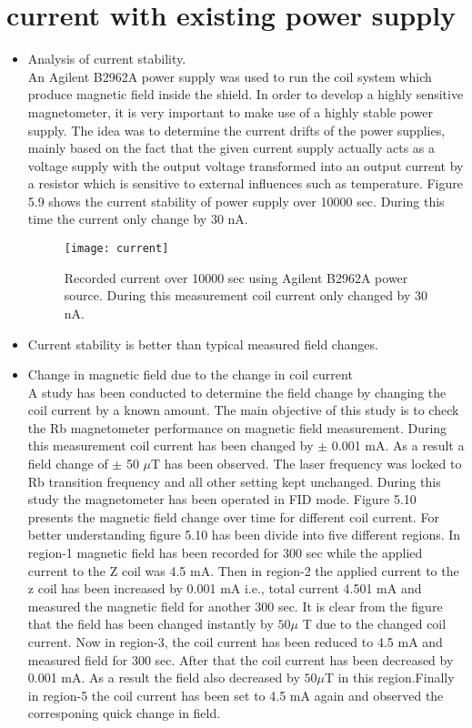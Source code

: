 \documentclass[12pt]{report}
\begin{document}
   \section{current with existing power supply}
   \begin{itemize}
   \item Analysis of current stability.\\
 An Agilent B2962A power supply was used to run the coil system which produce magnetic field inside the shield. In order to develop a highly sensitive magnetometer, it is very important to make use of a highly stable power supply. The idea was to determine the current drifts of the power supplies, mainly based on the fact that the given current supply actually acts as a voltage supply with the output voltage transformed into an output current by a resistor which is sensitive to external influences such as temperature. Figure 5.9 shows the current stability of power supply over 10000 sec. During this time the current only change by 30 nA.  
   \begin{figure}[h]
\centering
\texttt{[image: current]}
\caption{Recorded current over 10000 sec using Agilent B2962A power source. During this measurement coil current only changed by 30 nA. }
\end{figure}
   \item Current stability is better than typical measured field changes.
   \item Change in magnetic field due to the change in coil current\\
 A study has been conducted to determine the field change by changing the coil current by a known amount. The main objective of this study is to check the Rb magnetometer performance on magnetic field measurement. During this measurement coil current has been changed by $\pm$ 0.001 mA. As a result a field change of $\pm$ 50  $\mu$T  has been observed. The laser frequency was locked to Rb transition frequency and all other setting kept unchanged. During this study the magnetometer has been operated in FID mode. Figure 5.10 presents the magnetic field change over time for different coil current. For better understanding figure 5.10 has been divide into five different regions. In region-1 magnetic field  has been recorded for 300 sec while the applied current to the Z coil was 4.5 mA. Then in region-2 the applied current to the z coil has been increased by 0.001 mA i.e., total current 4.501 mA and measured the magnetic field for another 300 sec. It is clear from the figure that the field has been changed instantly by $50 \mu$ T due to the changed coil current. Now in region-3, the coil current has been reduced to 4.5 mA and measured field for 300 sec. After that the coil current has been decreased by 0.001 mA. As a result the field also decreased by $50 \mu$T in this region.Finally in region-5 the coil current has been set to 4.5 mA again and observed the corresponing quick change in field.


\end{itemize}
\end{document}
